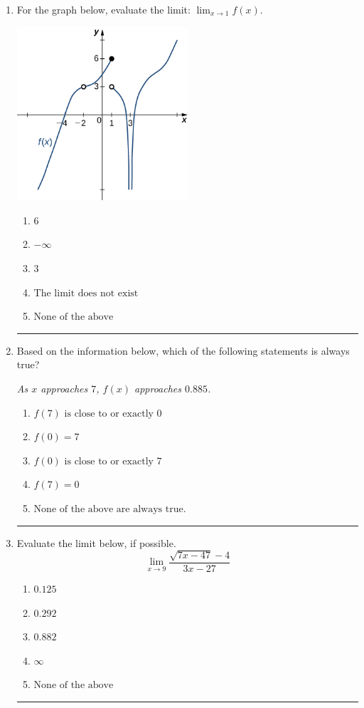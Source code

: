 \documentclass[14pt]{extbook}
\newcommand{\litem}[1]{\item#1\hspace*{-1cm}\rule{\textwidth}{0.4pt}}
\begin{document}
\begin{enumerate}
{\begin{enumerate}[label=\Alph*.]
\end{enumerate} }
\litem{
For the graph below, evaluate the limit: $ \displaystyle \lim_{x \rightarrow 1} f(x)$.
\begin{center}
    \includegraphics[width=0.5\textwidth]{../Figures/evaluateLimitGraphicallyB.png}
\end{center}
\begin{enumerate}[label=\Alph*.]
\item \( 6 \)
\item \( -\infty \)
\item \( 3 \)
\item \( \text{The limit does not exist} \)
\item \( \text{None of the above} \)

\end{enumerate} }
\litem{
Based on the information below, which of the following statements is always true?
\begin{center}
    \textit{ As $x$ approaches $7$, $f(x)$ approaches $0.885$. }
\end{center}
\begin{enumerate}[label=\Alph*.]
\item \( f(7) \text{ is close to or exactly } 0 \)
\item \( f(0) = 7 \)
\item \( f(0) \text{ is close to or exactly } 7 \)
\item \( f(7) = 0 \)
\item \( \text{None of the above are always true.} \)

\end{enumerate} }
\litem{
Evaluate the limit below, if possible.\[ \lim_{x \rightarrow 9} \frac{\sqrt{7x - 47} - 4}{3x - 27} \]\begin{enumerate}[label=\Alph*.]
\item \( 0.125 \)
\item \( 0.292 \)
\item \( 0.882 \)
\item \( \infty \)
\item \( \text{None of the above} \)


\end{enumerate}}
\end{enumerate}
\end{document}
